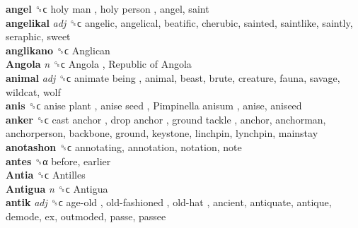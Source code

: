\textbf{angel} ␝ϲ   holy man ,  holy person , angel, saint  \\
\textbf{angelikal} \emph{adj}  ␝ϲ  angelic, angelical, beatific, cherubic, sainted, saintlike, saintly, seraphic, sweet  \\
\textbf{anglikano} ␝ϲ   Anglican   \\
\textbf{Angola} \emph{n}  ␝ϲ   Angola ,  Republic of Angola   \\
\textbf{animal} \emph{adj}  ␝ϲ   animate being , animal, beast, brute, creature, fauna, savage, wildcat, wolf  \\
\textbf{anis} ␝ϲ   anise plant ,  anise seed ,  Pimpinella anisum , anise, aniseed  \\
\textbf{anker} ␝ϲ   cast anchor ,  drop anchor ,  ground tackle , anchor, anchorman, anchorperson, backbone, ground, keystone, linchpin, lynchpin, mainstay  \\
\textbf{anotashon} ␝ϲ  annotating, annotation, notation, note  \\
\textbf{antes} ␝α  before, earlier  \\
\textbf{Antia} ␝ϲ   Antilles   \\
\textbf{Antigua} \emph{n}  ␝ϲ   Antigua   \\
\textbf{antik} \emph{adj}  ␝ϲ   age-old ,  old-fashioned ,  old-hat , ancient, antiquate, antique, demode, ex, outmoded, passe, passee  \\
